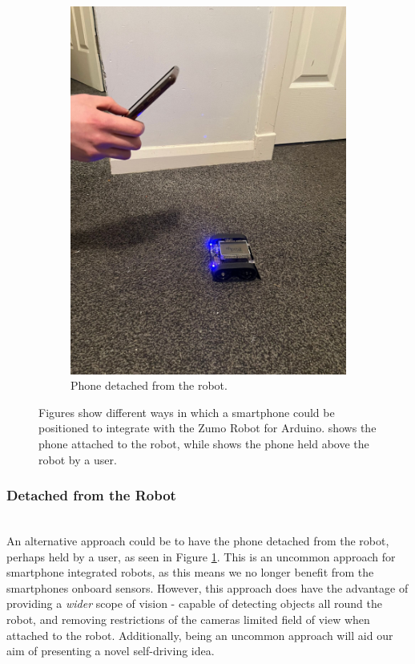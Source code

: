 \documentclass{l4proj}
\begin{document}
\begin{figure}[!h]
\begin{subfigure}{0.40\textwidth}
        \includegraphics[width=\textwidth]{images/phone-detatched.jpeg}
        \caption{Phone detached from the robot.}
        \label{fig:phone-detach}
    \end{subfigure}
    \label{fig:phone-attachment}
    \caption{Figures show different ways in which a smartphone could be positioned to integrate with the Zumo Robot for Arduino.  shows the phone attached to the robot, while  shows the phone held above the robot by a user.}
\end{figure}

\subsubsection{Detached from the Robot} \hfill \\
An alternative approach could be to have the phone detached from the robot, perhaps held by a user, as seen in Figure \ref{fig:phone-detach}. This is an uncommon approach for smartphone integrated robots, as this means we no longer benefit from the smartphones onboard sensors. However, this approach does have the advantage of providing a \textit{wider} scope of vision - capable of detecting objects all round the robot, and removing restrictions of the cameras limited field of view when attached to the robot. Additionally, being an uncommon approach will aid our aim of presenting a novel self-driving idea.
\end{document}
